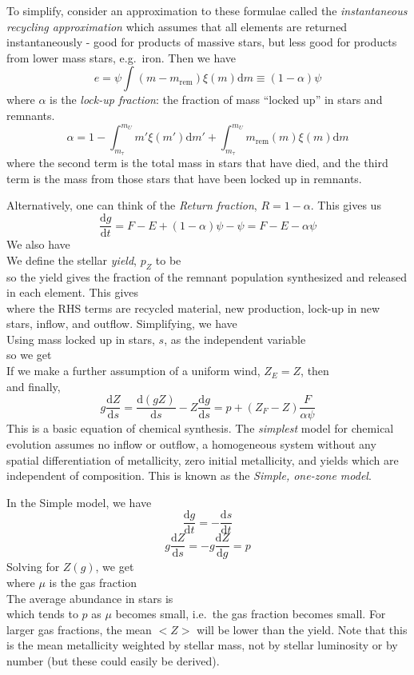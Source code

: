 \documentclass{article}
\begin{document}
To simplify, consider an approximation to these formulae called
the \textit{instantaneous recycling approximation} which assumes
that all elements are returned instantaneously - good for products
of massive stars, but less good for products from lower mass stars,
e.g.\ iron. Then we have
\[
    e = \psi\int{(m-m_{\textrm{rem}})\xi(m)\textrm{d}m}
    \equiv (1-\alpha)\psi
\]
where $\alpha$ is the \textit{lock-up fraction}: the fraction
of mass ``locked up'' in stars and remnants.
\[
    \alpha = 1-\int_{m_{\tau}}^{m_{U}}{{m'}\xi(m')\mathrm{d}{m'}} +
    \int_{m_{\tau}}^{m_{U}}{m_{\mathrm{rem}}(m)\xi(m)\mathrm{d}m}
\]
where the second term is the total mass in stars that have died, and
the third term is the mass from those stars that have been locked up
in remnants.

Alternatively, one can think of the \textit{Return fraction},
$R=1-\alpha$. This gives us
\[
    \frac{\mathrm{d}g}{\mathrm{d}t} = F-E+(1-\alpha)\psi-\psi=F-E-\alpha\psi
\]
We also have
\[
\]
We define the stellar \textit{yield}, $p_{Z}$ to be
\[
\]
so the yield gives the fraction of the remnant population synthesized
and released in each element. This gives
\[
\]
where the RHS terms are recycled material, new production, lock-up in
new stars, inflow, and outflow. Simplifying, we have
\[
\]
Using mass locked up in stars, $s$, as the independent variable
\[
\]
\[
\]
so we get
\[
\]
\[
\]
If we make a further assumption of a uniform wind, $Z_{E}=Z$, then
\[
\]
and finally,
\[
    g\frac{\mathrm{d}Z}{\mathrm{d}s} =
    \frac{\mathrm{d}(gZ)}{\mathrm{d}s} - Z\frac{\mathrm{d}g}{\mathrm{d}s} =
    p + (Z_{F} - Z)\frac{F}{\alpha\psi}
\]
\textcolor{bred}{This is a basic equation of chemical synthesis}.
The \emph{simplest} model for chemical evolution assumes no
inflow or outflow, a homogeneous system without any spatial
differentiation of metallicity, zero initial metallicity, and
yields which are independent of composition. This is known as the
\textit{Simple, one-zone model}.

In the Simple model, we have
\[
    \frac{\mathrm{d}g}{\mathrm{d}t} = -\frac{\mathrm{d}s}{\mathrm{d}t}
\]\[
    g\frac{\mathrm{d}Z}{\mathrm{d}s} = -g\frac{\mathrm{d}Z}{\mathrm{d}g} = p
\]
Solving for $Z(g)$, we get
\[
\]
where $\mu$ is the gas fraction
\[
\]
The average abundance in stars is
\[
\]
which tends to $p$ as $\mu$ becomes small, i.e.\ the gas fraction becomes
small. For larger gas fractions, the mean $<Z>$ will be lower than the yield.
Note that this is the mean metallicity weighted by stellar mass, not by
stellar luminosity or by number (but these could easily be derived).
\end{document}
